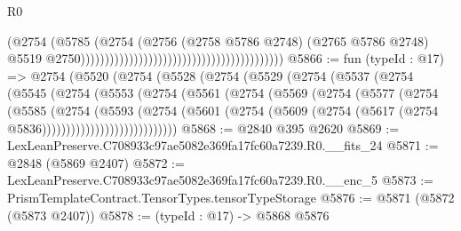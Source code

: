 \begin{lexlean}{R0}
\begin{coremodule}
                                                                                (@2754
                                                                                  (@5785
                                                                                    (@2754
                                                                                      (@2756
                                                                                        (@2758
                                                                                          @5786
                                                                                          @2748)
                                                                                        (@2765
                                                                                          @5786
                                                                                          @2748)
                                                                                        @5519
                                                                                        @2750))))))))))))))))))))))))))))))))))))))))))
@5866 := fun (typeId : @17) =>
  @2754
    (@5520
      (@2754
        (@5528
          (@2754
            (@5529
              (@2754
                (@5537
                  (@2754
                    (@5545
                      (@2754
                        (@5553
                          (@2754
                            (@5561
                              (@2754
                                (@5569
                                  (@2754
                                    (@5577
                                      (@2754
                                        (@5585
                                          (@2754
                                            (@5593
                                              (@2754
                                                (@5601
                                                  (@2754
                                                    (@5609
                                                      (@2754
                                                        (@5617
                                                          (@2754 @5836))))))))))))))))))))))))))))
@5868 := @2840 @395 @2620
@5869 := LexLeanPreserve.C708933c97ae5082e369fa17fc60a7239.R0.__fits_24
@5871 := @2848 (@5869 @2407)
@5872 := LexLeanPreserve.C708933c97ae5082e369fa17fc60a7239.R0.__enc_5
@5873 := PrismTemplateContract.TensorTypes.tensorTypeStorage
@5876 := @5871 (@5872 (@5873 @2407))
@5878 := (typeId : @17) -> @5868 @5876

\end{coremodule}
\end{lexlean}
